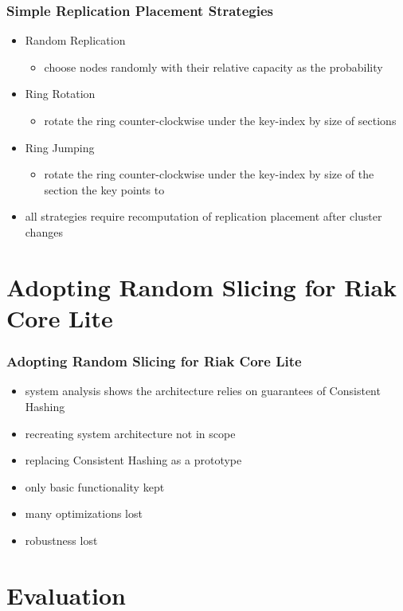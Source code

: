 \documentclass[aspectratio=169]{beamer}
\begin{document}
\begin{frame}
\frametitle{Simple Replication Placement Strategies}
\begin{itemize}
\item Random Replication
	\begin{itemize}
	\item choose nodes randomly with their relative capacity as the probability
	\end{itemize}
\item Ring Rotation
	\begin{itemize}
	\item rotate the ring counter-clockwise under the key-index by size of sections
	\end{itemize}
\item Ring Jumping
	\begin{itemize}
	\item rotate the ring counter-clockwise under the key-index by size of the section the key points to
	\end{itemize}
\item all strategies require recomputation of replication placement after cluster changes
\end{itemize}
\end{frame}


\section{Adopting Random Slicing for Riak Core Lite}
\begin{frame}
\frametitle{Adopting Random Slicing for Riak Core Lite}
\begin{itemize}
\item system analysis shows the architecture relies on guarantees of Consistent Hashing
\item recreating system architecture not in scope
\item replacing Consistent Hashing as a prototype
\item only basic functionality kept
\item many optimizations lost
\item robustness lost
\end{itemize}
\end{frame}

\section{Evaluation}
\end{document}
